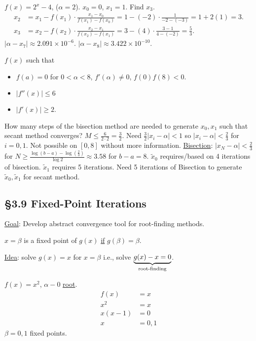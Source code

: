 \documentclass[]{article}
\begin{document}
\begin{example}
	$f(x) = 2^x-4$, ($\alpha = 2$). $x_0=0$, $x_1=1$. Find $x_3$. 
	\begin{align*}
		x_2 &= x_1-f(x_1)\cdot \frac{x_1-x_0}{f(x_1)-f(x_0)}
			= 1-(-2)\cdot\frac1{-2-(-3)} = 1+2(1) = 3. \\
		x_3 &= x_2 - f(x_2) \cdot \frac{x_2-x_1}{f(x_2)-f(x_1)}
			= 3-(4)\cdot\frac{3-1}{4-(-2)} = \frac53.
	\end{align*}
	$|\alpha-x_7|\approx 2.091\times10^{-6}$. $|\alpha-x_8| \approx 3.422\times10^{-10}$.
\end{example}
\begin{example}
	$f(x)$ such that
	\begin{itemize}
		\item $f(a)=0$ for $0<\alpha<8$, $f'(\alpha)\neq0$, $f(0)f(8)<0$.
		\item $|f''(x)| \leq 6$
		\item $|f'(x)|\geq 2$.
	\end{itemize}
	How many steps of the bisection method are needed to generate $x_0,x_1$ such that secant method converges?
	$ M\leq\frac6{2\cdot2} = \frac32$. Need $\frac32|x_i-\alpha|<1$ so $|x_i-\alpha|<\frac23$ for $i=0,1$.
	Not possible on $[0,8]$ without more information.
	\ul{Bisection}: $|x_N-\alpha| < \frac23$ for $N\geq \frac{\log(b-a)-\log(\frac23)}{\log 2} \approx 3.58$ for $b-a=8$.
	$\tilde x_0$ requires/based on 4 iterations of bisection.
	$\tilde x_1$ requires 5 iterations.
	Need 5 iterations of Bisection to generate $\tilde x_0,\tilde x_1$ for secant method.
\end{example}

\subsection*{\S3.9 Fixed-Point Iterations}

\ul{Goal}: Develop abstract convergence tool for root-finding methods.
\begin{definition}
	$x = \beta$ is a fixed point of $g(x)$ \ul{if} $g(\beta)=\beta$.
\end{definition}
\ul{Idea}: solve $g(x)=x$ for $x=\beta$ i.e., solve $\ub{\text{root-finding}}{g(x)-x=0}$.
\begin{example}
	$f(x)=x^2$, $\alpha-0$ \ul{root}.
	\begin{align*}
		f(x) &=x \\
		x^2 &=x \\
		x(x-1) &=0 \\
		x &= 0,1
	\end{align*}
	$\beta=0,1$ fixed points.
\end{example}
\end{document}
